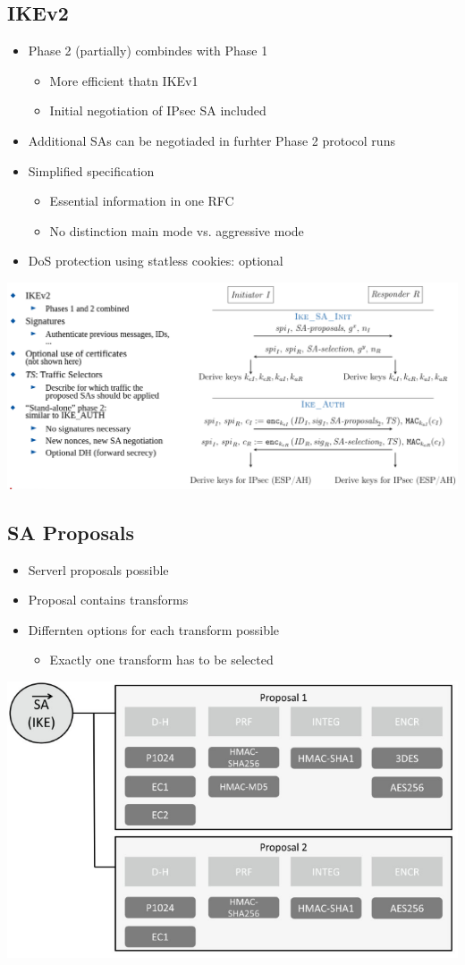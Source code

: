 \subsection{IKEv2}
\begin{itemize}
  \item Phase 2 (partially) combindes with Phase 1
    \begin{itemize}
      \item More efficient thatn IKEv1
      \item Initial negotiation of IPsec SA included
    \end{itemize}
  \item Additional SAs can be negotiaded in furhter Phase 2 protocol runs
  \item Simplified specification
    \begin{itemize}
      \item Essential information in one RFC
      \item No distinction main mode vs. aggressive mode
    \end{itemize}
  \item DoS protection using statless cookies: optional
\end{itemize}
\includegraphics[width=\columnwidth]{Resources/ikev2.png}

\subsection{SA Proposals}
\begin{itemize}
  \item Serverl proposals possible
  \item Proposal contains transforms
  \item Differnten options for each transform possible
    \begin{itemize}
      \item Exactly one transform has to be selected
    \end{itemize}
\end{itemize}
\includegraphics[width=0.7\columnwidth]{Resources/ike_sa_proposal.png}


